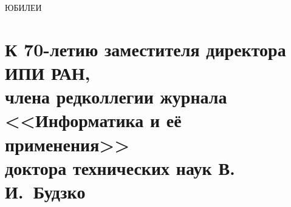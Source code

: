 
\def\stat{rekl}





   \begin{center}

{\prgsh\LARGE
ЮБИЛЕИ}

\end{center}

\vspace*{6pt}


   \vspace*{8mm}

   \thispagestyle{empty}




\section*{К 70-летию заместителя директора ИПИ РАН,\\ члена редколлегии журнала
<<Информатика и её применения>>\\ доктора технических наук В.\,И.~Будзко}

\vspace*{18pt}




